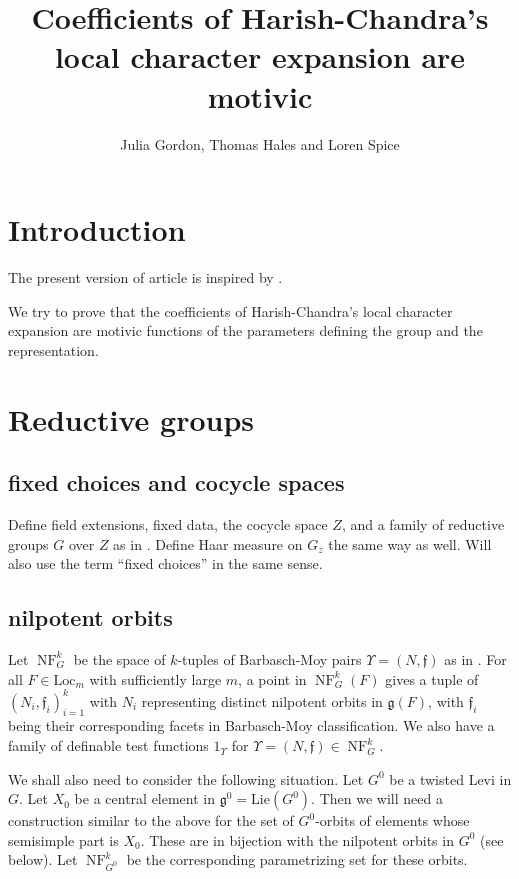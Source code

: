 \documentclass[12pt]{amsart}
\title{Coefficients of Harish-Chandra's local character expansion are motivic}
\author{Julia Gordon, Thomas Hales and Loren Spice}
\newcommand{\fg}{\mathfrak{g}}
\newcommand{\ff}{\mathfrak{f}}
\newcommand{\Loc}{\mathrm{Loc}}
\def\Lie{\mathrm{Lie}}
\newcommand{\op}[1]{\operatorname{#1}}
\newcommand{\NF}{\op{NF}}
\theoremstyle{plain}
\theoremstyle{definition}
\begin{document}

\maketitle

\section{Introduction}
The present version of article is inspired by \cite{unsuccessful self-treatment of writer's block}. 
 
We try to prove that the coefficients of Harish-Chandra's local character expansion are motivic functions of the parameters defining the group and the representation. 

\section{Reductive groups}
\subsection{fixed choices and cocycle spaces}
Define field extensions, fixed data, the cocycle space $Z$, and a family of reductive groups $G$ over $Z$ as in \cite{transfer transfer}. Define Haar measure on $G_z$ the same way as well.
Will also use the term ``fixed choices'' in the same sense. 

\subsection{nilpotent orbits} Let $\NF_G^k$ be the space of 
$k$-tuples of Barbasch-Moy pairs $\Upsilon=(N, \ff)$ as in  \cite{transfertransfer}. 
For all $F\in \Loc_m$ with sufficiently large $m$, 
a point in $\NF_G^k(F)$ gives a tuple of $(N_i, \ff_i)_{i=1}^k$ with $N_i$ representing distinct nilpotent orbits in $\fg(F)$, with $\ff_i$ being their corresponding facets in Barbasch-Moy classification. We also have a family of definable test functions $1_{\Upsilon}$ for 
$\Upsilon=(N, \ff)\in \NF_G^k$. 

We shall also need to consider the following situation. 
Let $G^0$ be a twisted Levi in $G$. 
Let $X_0$ be a central element in $\fg^0=\Lie(G^0)$. 
Then we will need a construction similar to the above for the set of $G^0$-orbits of elements whose semisimple part is $X_0$. These are in bijection with the nilpotent orbits in $G^0$ (see below). 
Let $\NF_{G^0}^k$ be the corresponding parametrizing set for these orbits. 
\end{document}
